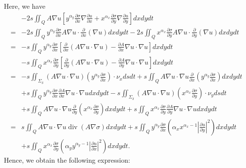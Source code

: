 \documentclass[9pt,reqno]{amsart}
\theoremstyle{plain}
\numberwithin{equation}{section}
\numberwithin{theorem}{section}
\DeclareMathOperator*{\Div}{\mathrm{div}}
\begin{document}
	Here, we have
	\begin{equation*}
		\begin{split}
			&-2s \iint_{Q} A \nabla u \left[ y^{\alpha_y} \frac{\partial \sigma}{\partial x}\nabla \frac{\partial u}{\partial x}  + x^{\alpha_x} \frac{\partial \sigma}{\partial y}\nabla \frac{\partial u}{\partial y}\right] dx dydt\\%
			=& -2s \iint_Q y^{\alpha_y} \frac{\partial \sigma}{\partial x}  A \nabla u \cdot \frac{\partial}{\partial x}(\nabla u) dx dydt - 2s \iint_Q x^{\alpha_x} \frac{\partial \sigma}{\partial y}  A \nabla u \cdot \frac{\partial}{\partial y}(\nabla u) dx dydt\\%
			=& -s \iint_{Q} y^{\alpha_y} \frac{\partial \sigma}{\partial x} \left[ \frac{\partial}{\partial x} (A \nabla u \cdot \nabla u) - \frac{\partial A}{\partial x} \nabla u \cdot \nabla u \right] dx dydt\\
			&-s \iint_{Q} x^{\alpha_x} \frac{\partial \sigma}{\partial y} \left[ \frac{\partial}{\partial y} (A \nabla u \cdot \nabla u) - \frac{\partial A}{\partial y} \nabla u \cdot \nabla u \right] dx dydt\\%
			=&-s \iint_{\Sigma_\delta} (A \nabla u \cdot \nabla u)(y^{\alpha_y} \frac{\partial \sigma}{\partial x}) \cdot \nu_x dsdt + s\iint_{Q} A \nabla u \cdot \nabla u \frac{\partial}{\partial x} (y^{\alpha_y} \frac{\partial \sigma}{\partial x}) dx dydt\\
			& +s \iint_{Q} y^{\alpha_y} \frac{\partial \sigma}{\partial x} \frac{\partial A}{\partial x} \nabla u \cdot \nabla u dx dydt
			-s \iint_{\Sigma_\delta} (A \nabla u \cdot \nabla u)(x^{\alpha_x} \frac{\partial \sigma}{\partial y}) \cdot \nu_y dsdt\\
			& + s\iint_{Q} A \nabla u \cdot \nabla u \frac{\partial}{\partial y} (x^{\alpha_x} \frac{\partial \sigma}{\partial y}) dx dydt +s \iint_{Q} x^{\alpha_x} \frac{\partial \sigma}{\partial y} \frac{\partial A}{\partial y} \nabla u \cdot \nabla u dx dydt\\%
			=&  s \iint_{Q} A\nabla u \cdot \nabla u \Div(A\nabla \sigma) dx dydt
			+ s\iint_{Q} y^{\alpha_y} \frac{\partial \sigma}{\partial x} (\alpha_x x^{\alpha_x-1}\left| \frac{\partial u}{\partial y}\right| ^2) dx dydt\\
			&+ s\iint_{Q} x^{\alpha_x} \frac{\partial \sigma}{\partial y} (\alpha_y y^{\alpha_y-1}\left| \frac{\partial u}{\partial x}\right| ^2) dx dydt.
		\end{split}
	\end{equation*}
	Hence, we obtain the following expression:
\end{document}
